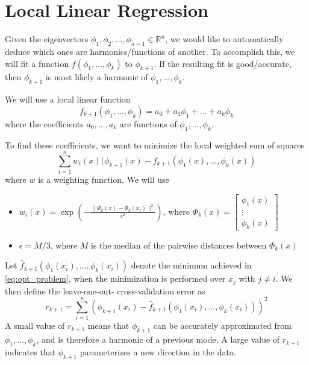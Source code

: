 \documentclass[12pt]{article}
\begin{document}
\section{Local Linear Regression}

Given the eigenvectors $\phi_1, \phi_2, \dots, \phi_{n-1} \in \mathbb{R}^n$, we would like to automatically deduce which ones are harmonics/functions of another. 
%
To accomplish this, we will fit a function $f(\phi_1, \dots, \phi_k)$ to $\phi_{k+1}$. 
%
If the resulting fit is good/accurate, then $\phi_{k+1}$ is most likely a harmonic of $\phi_1, \dots, \phi_k$. 

We will use a local linear function 
\begin{equation}
f_{k+1}(\phi_1, \dots, \phi_k) = a_0 + a_1 \phi_1 + \dots + a_k \phi_k
\end{equation}
where the coefficients $a_0, \dots, a_k$ are functions of $\phi_1, \dots, \phi_k$. 


To find these coefficients, we want to minimize the local weighted sum of squares
\begin{equation} \label{eq:opt_problem}
\sum_{i=1}^n w_i(x) (\phi_{k+1}(x) - f_{k+1} (\phi_1(x), \dots, \phi_{k}(x))
\end{equation}
where $w$ is a weighting function.
%
We will use
%
\begin{itemize}
\item $w_i(x) = \exp \left( - \frac{\|\Phi_{k}(x) - \Phi_{k} (x_i) \|^2}{\epsilon^2} \right)$, where $\Phi_k(x) = \begin{bmatrix}
\phi_1(x) \\
\vdots \\
\phi_k(x)
\end{bmatrix} $
\item $\epsilon = M / 3$, where $M$ is the median of the pairwise distances between $\Phi_{k}(x)$
\end{itemize}

Let $\hat{f}_{k+1}(\phi_1(x_i), \dots, \phi_k(x_i))$ denote the minimum achieved in \eqref{eq:opt_problem}, when the minimization is performed over $x_j$ with $j \ne i$. 
%
We then define the leave-one-out- cross-validation error as
\begin{equation}
r_{k+1} = \sum_{i=1}^n \left( \phi_{k+1} (x_i) - \hat{f}_{k+1}(\phi_1(x_i), \dots, \phi_k(x_i)) \right)^2
\end{equation}
%
A small value of $r_{k+1}$ means that $\phi_{k+1}$ can be accurately approximated from $\phi_1, \dots, \phi_k$, and is therefore a harmonic of a previous mode.
%
A large value of $r_{k+1}$ indicates that $\phi_{k+1}$ parameterizes a new direction in the data.
\end{document}
